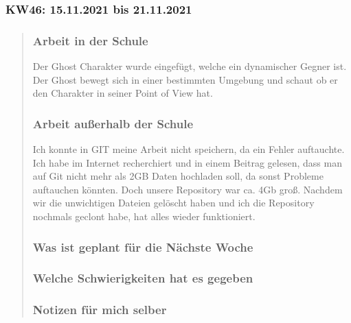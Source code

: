 
\subsubsection{KW46: 15.11.2021 bis 21.11.2021}
\begin{quote}
	\subsubsection*{Arbeit in der Schule}
	Der Ghost Charakter wurde eingefügt, welche ein dynamischer Gegner ist. Der Ghost bewegt sich in einer bestimmten Umgebung und schaut ob er den Charakter in seiner Point of View hat. 
	\subsubsection*{Arbeit außerhalb der Schule}
	Ich konnte in GIT meine Arbeit nicht speichern, da ein Fehler auftauchte.
	Ich habe im Internet recherchiert und in einem Beitrag gelesen, dass man auf Git nicht mehr als 2GB Daten hochladen soll, da sonst Probleme auftauchen könnten. Doch unsere Repository war ca. 4Gb groß. Nachdem wir die unwichtigen Dateien gelöscht haben und ich die Repository nochmals geclont habe, hat alles wieder funktioniert. 
	\subsubsection*{Was ist geplant für die Nächste Woche}

	\subsubsection*{Welche Schwierigkeiten hat es gegeben}
	
	\subsubsection*{Notizen für mich selber}
\end{quote}
